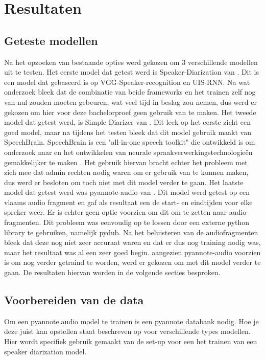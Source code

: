 
\chapter{Resultaten}%
\label{ch:resultaten}

\section{Geteste modellen}
\label{sec:modellen}
Na het opzoeken van bestaande opties werd gekozen om 3 verschillende modellen uit te testen. Het eerste model dat getest werd is Speaker-Diarization van \textcite{DongLu}. Dit is een model dat gebaseerd is op VGG-Speaker-recognition en UIS-RNN. Na wat onderzoek bleek dat de combinatie van beide frameworks en het trainen zelf nog van nul zouden moeten gebeuren, wat veel tijd in beslag zou nemen, dus werd er gekozen om hier voor deze bachelorproef geen gebruik van te maken.
Het tweede model dat getest werd, is Simple Diarizer van \textcite{Chau}. Dit leek op het eerste zicht een goed model, maar na tijdens het testen bleek dat dit model gebruik maakt van SpeechBrain. SpeechBrain is een "all-in-one speech toolkit" die ontwikkeld is om onderzoek naar en het ontwikkelen van neurale spraakverwerkingstechnologieën gemakkelijker te maken \autocite{speechbrain}. Het gebruik hiervan bracht echter het probleem met zich mee dat admin rechten nodig waren om er gebruik van te kunnen maken, dus werd er besloten om toch niet met dit model verder te gaan.
Het laatste model dat getest werd was pyannote-audio van \textcite{Bredin2024}. Dit model werd getest op een vlaams audio fragment en gaf als resultaat een de start- en eindtijden voor elke spreker weer. Er is echter geen optie voorzien om dit om te zetten naar audio-fragmenten. Dit probleem was eenvoudig op te lossen door een externe python library te gebruiken, namelijk pydub. Na het beluisteren van de audiofragmenten bleek dat deze nog niet zeer accuraat waren en dat er dus nog training nodig was, maar het resultaat was al een zeer goed begin. aangezien pyannote-audio voorzien is om nog verder getraind te worden, werd er gekozen om met dit model verder te gaan. De resultaten hiervan worden in de volgende secties besproken.

\section{Voorbereiden van de data}
\label{sec:data}
Om een pyannote.audio model te trainen is een pyannote databank nodig. Hoe je deze juist kan opstellen staat beschreven op \textcite{BredinDatabase} voor verschillende types modellen. Hier wordt specifiek gebruik gemaakt van de set-up voor een het trainen van een speaker diarization model.

